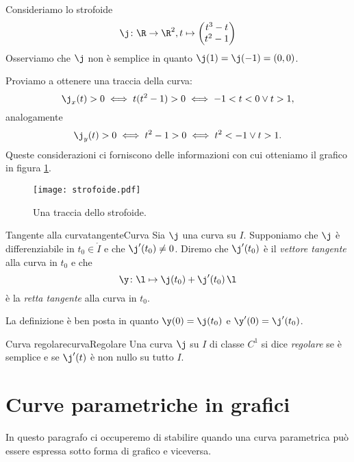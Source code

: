 \begin{ese}
	Consideriamo lo strofoide
	\[
		\j\colon \R \to \R^2, t \mapsto \begin{pmatrix}
			t^3-t \\
			t^2-1
		\end{pmatrix}
	\]
	Osserviamo che \(\j\) non è semplice in quanto \(\j(1)=\j(-1)=(0,0)\).

	Proviamo a ottenere una traccia della curva:
	\[
		\j_x(t)>0 \iff t(t^2-1) > 0 \iff -1<t<0 \vee t>1,
	\]
	analogamente
	\[
		\j_y(t) > 0 \iff t^2-1 >0 \iff t^2 < -1 \vee t>1.
	\]
	Queste considerazioni ci forniscono delle informazioni con cui otteniamo il grafico in figura \ref{fig:strofoide}.
\end{ese}

\begin{figure}[tp]
	\begin{centering}
		\texttt{[image: strofoide.pdf]}
		\caption{Una traccia dello strofoide.}
		\label{fig:strofoide}
	\end{centering}
\end{figure}

\begin{defn}{Tangente alla curva}{tangenteCurva}
	Sia \(\j\) una curva su \(I\).
	Supponiamo che \(\j\) è differenziabile in \(t_0\in\mathring{I}\) e che \(\j'(t_0)\neq 0\).
	Diremo che \(\j'(t_0)\) è il \emph{vettore tangente} alla curva in \(t_0\) e che
	\[
		\y\colon \l \mapsto \j(t_0)+\j'(t_0)\,\l
	\]
	è la \emph{retta tangente} alla curva in \(t_0\).
\end{defn}

\begin{oss}
	La definizione è ben posta in quanto \(\y(0)=\j(t_0)\) e \(\y'(0)=\j'(t_0)\).
\end{oss}

\begin{defn}{Curva regolare}{curvaRegolare}
	Una curva \(\j\) su \(I\) di classe \(C^1\) si dice \emph{regolare} se è semplice e se \(\j'(t)\) è non nullo su tutto \(I\).
\end{defn}
\section{Curve parametriche in grafici}

In questo paragrafo ci occuperemo di stabilire quando una curva parametrica può essere espressa sotto forma di grafico e viceversa.

